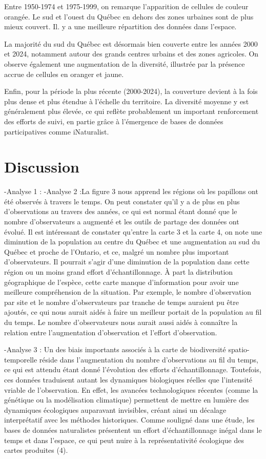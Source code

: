 \documentclass[9pt,twocolumn,twoside,]{pnas-new}
\begin{document}
Entre 1950-1974 et 1975-1999, on remarque l'apparition de cellules de
couleur orangée. Le sud et l'ouest du Québec en dehors des zones
urbaines sont de plus mieux couvert. Il. y a une meilleure répartition
des données dans l'espace.

La majorité du sud du Québec est désormais bien couverte entre les
années 2000 et 2024, notamment autour des grands centres urbains et des
zones agricoles. On observe également une augmentation de la diversité,
illustrée par la présence accrue de cellules en oranger et jaune.

Enfin, pour la période la plus récente (2000-2024), la couverture
devient à la fois plus dense et plus étendue à l'échelle du territoire.
La diversité moyenne y est généralement plus élevée, ce qui reflète
probablement un important renforcement des efforts de suivi, en partie
grâce à l'émergence de bases de données participatives comme
iNaturalist.

\section{Discussion}\label{discussion}

-Analyse 1 : -Analyse 2 :La figure 3 nous apprend les régions où les
papillons ont été observés à travers le temps. On peut constater qu'il y
a de plus en plus d'observations au travers des années, ce qui est
normal étant donné que le nombre d'observateurs a augmenté et les outils
de partage des données ont évolué. Il est intéressant de constater
qu'entre la carte 3 et la carte 4, on note une diminution de la
population au centre du Québec et une augmentation au sud du Québec et
proche de l'Ontario, et ce, malgré un nombre plus important
d'observateurs. Il pourrait s'agir d'une diminution de la population
dans cette région ou un moins grand effort d'échantillonnage. À part la
distribution géographique de l'espèce, cette carte manque d'information
pour avoir une meilleure compréhension de la situation. Par exemple, le
nombre d'observation par site et le nombre d'observateurs par tranche de
temps auraient pu être ajoutés, ce qui nous aurait aidés à faire un
meilleur portait de la population au fil du temps. Le nombre
d'observateurs nous aurait aussi aidés à connaître la relation entre
l'augmentation d'observation et l'effort d'observation.

-Analyse 3 : Un des biais importants associés à la carte de biodiversité
spatio-temporelle réside dans l'augmentation du nombre d'observations au
fil du temps, ce qui est attendu étant donné l'évolution des efforts
d'échantillonnage. Toutefois, ces données traduisent autant les
dynamiques biologiques réelles que l'intensité vriable de l'observation.
En effet, les avancées technologiques récentes (comme la génétique ou la
modélisation climatique) permettent de mettre en lumière des dynamiques
écologiques auparavant invisibles, créant ainsi un décalage
interprétatif avec les méthodes historiques. Comme souligné dans une
étude, les bases de données naturalistes présentent un effort
d'échantillonnage inégal dans le temps et dans l'espace, ce qui peut
nuire à la représentativité écologique des cartes produites (4).
\end{document}
